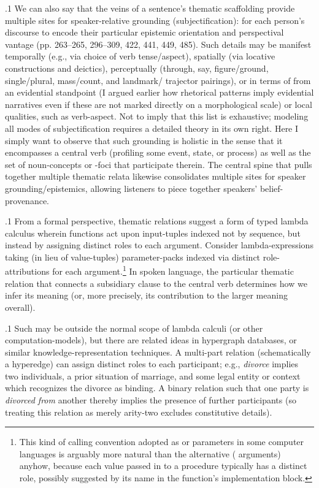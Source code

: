 \documentclass[11pt, twocolumn]{article}
\begin{document}
{{\p.1{%
We can also say that the veins of a sentence's thematic scaffolding
provide multiple sites for speaker-relative grounding
(subjectification): for
each person's discourse to encode their particular epistemic
orientation and perspectival vantage (pp. 263--265, 296--309, 422, 
441, 449, 485). Such details may
be manifest temporally (e.g., via choice of verb tense/aspect),
spatially (via locative constructions and deictics), perceptually
(through, say, figure/ground, single/plural,
mass/count, and landmark/ trajector pairings),
or in terms of  from an evidential
standpoint (I argued earlier how rhetorical patterns
imply evidential narratives even if these are not marked
directly on a morphological scale) or local qualities, such as
verb-aspect. Not to imply that this list is exhaustive;
modeling all modes of subjectification requires a detailed
theory in its own right. Here I simply want to observe that
such grounding is holistic in the sense that it encompasses
a central verb (profiling some event, state,
or process) as well as
the set of noun-concepts or -foci that participate therein.
The central spine that pulls together multiple thematic
relata likewise consolidates multiple sites for speaker
grounding/epistemics, allowing listeners to piece together
speakers' belief-provenance.
}%

\p.1{%
From a formal perspective, thematic relations suggest a
form of typed lambda calculus wherein functions act upon
input-tuples indexed not by sequence, but instead by
assigning distinct roles to each argument.
Consider lambda-expressions taking (in lieu of
value-tuples) parameter-packs indexed via
distinct role-attributions for each argument.\footnote{
\label{fn:cc} This kind of calling convention
\mdash{} adopted as  or  parameters
in some computer languages \mdash{} is arguably
more natural than the alternative (
arguments) anyhow, because each value passed in to a procedure
typically has a distinct role, possibly suggested by its
name in the function's implementation
block.}  In spoken language, the particular
thematic relation that connects a subsidiary clause to the
central verb determines how we infer its meaning
(or, more precisely, its contribution to the larger meaning overall).
}%

\p.1{%
Such  may be outside the normal
scope of lambda calculi (or other computation-models), but there are
related ideas in
hypergraph databases, or similar knowledge-representation techniques.
A multi-part relation (schematically a hyperedge) can assign distinct roles
to each participant; e.g., \textit{divorce} implies two individuals,
a prior situation of marriage, and some legal entity or
context which recognizes the divorce as binding.
A binary relation such that one party is \textit{divorced from}
another thereby implies the presence of further participants
(so treating this relation as merely arity-two excludes constitutive
details).
}%

}}
\end{document}
